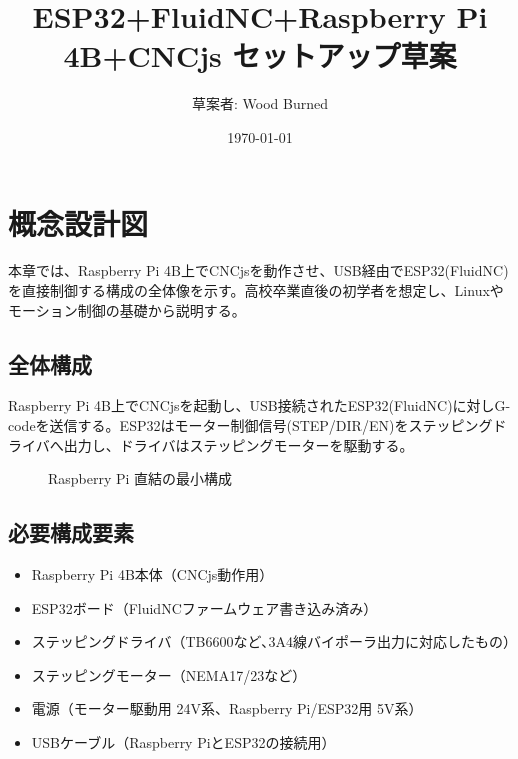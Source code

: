 \documentclass[uplatex,dvipdfmx]{ujarticle}
\begin{document}
\title{ESP32+FluidNC+Raspberry Pi 4B+CNCjs セットアップ草案}
\author{草案者: Wood Burned}
\date{\today}
\maketitle



\section{概念設計図}

本章では、Raspberry Pi 4B上でCNCjsを動作させ、USB経由でESP32(FluidNC)を直接制御する構成の全体像を示す。高校卒業直後の初学者を想定し、Linuxやモーション制御の基礎から説明する。

\subsection{全体構成}

Raspberry Pi 4B上でCNCjsを起動し、USB接続されたESP32(FluidNC)に対しG-codeを送信する。ESP32はモーター制御信号(STEP/DIR/EN)をステッピングドライバへ出力し、ドライバはステッピングモーターを駆動する。

\begin{figure}[h]
\centering
{}
\caption{Raspberry Pi 直結の最小構成}
\end{figure}

\subsection{必要構成要素}
\begin{itemize}
    \item Raspberry Pi 4B本体（CNCjs動作用）
    \item ESP32ボード（FluidNCファームウェア書き込み済み）
    \item ステッピングドライバ（TB6600など､3A4線バイポーラ出力に対応したもの）
    \item ステッピングモーター（NEMA17/23など）
    \item 電源（モーター駆動用 24V系、Raspberry Pi/ESP32用 5V系）
    \item USBケーブル（Raspberry PiとESP32の接続用）
\end{itemize}
\end{document}
